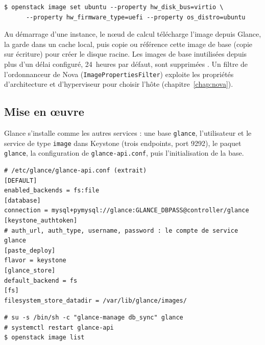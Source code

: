 \par\noindent\begin{minipage}{\linewidth}
\begin{lstlisting}[style=terminal]
$ openstack image set ubuntu --property hw_disk_bus=virtio \
      --property hw_firmware_type=uefi --property os_distro=ubuntu
\end{lstlisting}
\end{minipage}\par

Au démarrage d'une instance, le nœud de calcul télécharge l'image depuis Glance, la garde dans un cache local, puis
copie ou référence cette image de base (copie sur écriture) pour créer le disque racine. Les images de base inutilisées
depuis plus d'un délai configuré, 24~heures par défaut, sont supprimées \parencite{nova-image-caching}. Un
filtre de l'ordonnanceur de Nova (\texttt{ImagePropertiesFilter}) exploite les propriétés d'architecture et d'hyperviseur
pour choisir l'hôte (chapitre~\ref{chap:nova}).

\subsection{Mise en œuvre}\label{sec:gl-deploiement}

Glance s'installe comme les autres services \parencite{glance-install} : une base \texttt{glance}, l'utilisateur et le
service de type \texttt{image} dans Keystone (trois endpoints, port 9292), le paquet \texttt{glance}, la configuration de
\texttt{glance-api.conf}, puis l'initialisation de la base.

\par\noindent\begin{minipage}{\linewidth}
\begin{lstlisting}
# /etc/glance/glance-api.conf (extrait)
[DEFAULT]
enabled_backends = fs:file
[database]
connection = mysql+pymysql://glance:GLANCE_DBPASS@controller/glance
[keystone_authtoken]
# auth_url, auth_type, username, password : le compte de service glance
[paste_deploy]
flavor = keystone
[glance_store]
default_backend = fs
[fs]
filesystem_store_datadir = /var/lib/glance/images/
\end{lstlisting}
\end{minipage}\par

\par\noindent\begin{minipage}{\linewidth}
\begin{lstlisting}[style=terminal]
# su -s /bin/sh -c "glance-manage db_sync" glance
# systemctl restart glance-api
$ openstack image list
\end{lstlisting}
\end{minipage}\par

